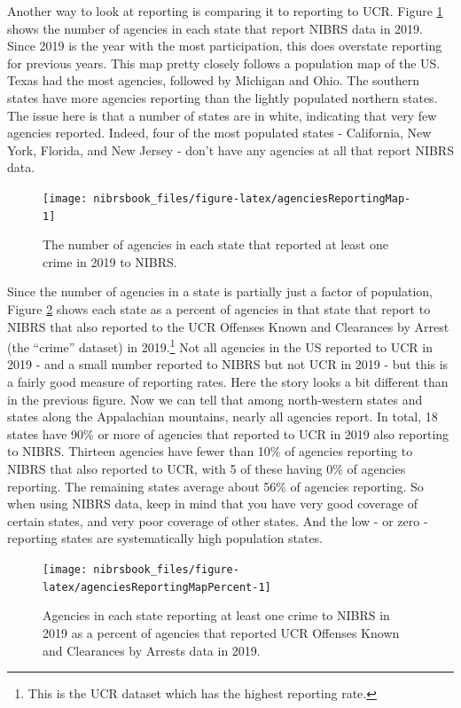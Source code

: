 \documentclass[
  12pt,
  openany]{book}
\begin{document}
Another way to look at reporting is comparing it to reporting to UCR. Figure \ref{fig:agenciesReportingMap} shows the number of agencies in each state that report NIBRS data in 2019. Since 2019 is the year with the most participation, this does overstate reporting for previous years. This map pretty closely follows a population map of the US. Texas had the most agencies, followed by Michigan and Ohio. The southern states have more agencies reporting than the lightly populated northern states. The issue here is that a number of states are in white, indicating that very few agencies reported. Indeed, four of the most populated states - California, New York, Florida, and New Jersey - don't have any agencies at all that report NIBRS data.

\begin{figure}

{\centering \texttt{[image: nibrsbook\_files/figure-latex/agenciesReportingMap-1]} 

}

\caption{The number of agencies in each state that reported at least one crime in 2019 to NIBRS.}\label{fig:agenciesReportingMap}
\end{figure}

Since the number of agencies in a state is partially just a factor of population, Figure \ref{fig:agenciesReportingMapPercent} shows each state as a percent of agencies in that state that report to NIBRS that also reported to the UCR Offenses Known and Clearances by Arrest (the ``crime'' dataset) in 2019.\footnote{This is the UCR dataset which has the highest reporting rate.} Not all agencies in the US reported to UCR in 2019 - and a small number reported to NIBRS but not UCR in 2019 - but this is a fairly good measure of reporting rates. Here the story looks a bit different than in the previous figure. Now we can tell that among north-western states and states along the Appalachian mountains, nearly all agencies report. In total, 18 states have 90\% or more of agencies that reported to UCR in 2019 also reporting to NIBRS. Thirteen agencies have fewer than 10\% of agencies reporting to NIBRS that also reported to UCR, with 5 of these having 0\% of agencies reporting. The remaining states average about 56\% of agencies reporting. So when using NIBRS data, keep in mind that you have very good coverage of certain states, and very poor coverage of other states. And the low - or zero - reporting states are systematically high population states.

\begin{figure}

{\centering \texttt{[image: nibrsbook\_files/figure-latex/agenciesReportingMapPercent-1]} 

}

\caption{Agencies in each state reporting at least one crime to NIBRS in 2019 as a percent of agencies that reported UCR Offenses Known and Clearances by Arrests data in 2019.}\label{fig:agenciesReportingMapPercent}
\end{figure}
\end{document}
